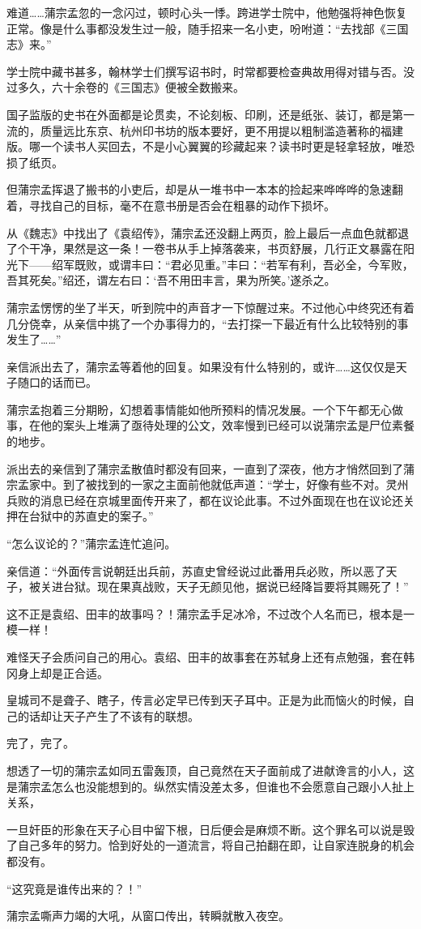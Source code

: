 难道……蒲宗孟忽的一念闪过，顿时心头一悸。跨进学士院中，他勉强将神色恢复正常。像是什么事都没发生过一般，随手招来一名小吏，吩咐道：“去找部《三国志》来。”

学士院中藏书甚多，翰林学士们撰写诏书时，时常都要检查典故用得对错与否。没过多久，六十余卷的《三国志》便被全数搬来。

国子监版的史书在外面都是论贯卖，不论刻板、印刷，还是纸张、装订，都是第一流的，质量远比东京、杭州印书坊的版本要好，更不用提以粗制滥造著称的福建版。哪一个读书人买回去，不是小心翼翼的珍藏起来？读书时更是轻拿轻放，唯恐损了纸页。

但蒲宗孟挥退了搬书的小吏后，却是从一堆书中一本本的捡起来哗哗哗的急速翻着，寻找自己的目标，毫不在意书册是否会在粗暴的动作下损坏。

从《魏志》中找出了《袁绍传》，蒲宗孟还没翻上两页，脸上最后一点血色就都退了个干净，果然是这一条！一卷书从手上掉落袭来，书页舒展，几行正文暴露在阳光下——绍军既败，或谓丰曰：“君必见重。”丰曰：“若军有利，吾必全，今军败，吾其死矣。”绍还，谓左右曰：‘吾不用田丰言，果为所笑。’遂杀之。

蒲宗孟愣愣的坐了半天，听到院中的声音才一下惊醒过来。不过他心中终究还有着几分侥幸，从亲信中挑了一个办事得力的，“去打探一下最近有什么比较特别的事发生了……”

亲信派出去了，蒲宗孟等着他的回复。如果没有什么特别的，或许……这仅仅是天子随口的话而已。

蒲宗孟抱着三分期盼，幻想着事情能如他所预料的情况发展。一个下午都无心做事，在他的案头上堆满了亟待处理的公文，效率慢到已经可以说蒲宗孟是尸位素餐的地步。

派出去的亲信到了蒲宗孟散值时都没有回来，一直到了深夜，他方才悄然回到了蒲宗孟家中。到了被找到的一家之主面前他就低声道：“学士，好像有些不对。灵州兵败的消息已经在京城里面传开来了，都在议论此事。不过外面现在也在议论还关押在台狱中的苏直史的案子。”

“怎么议论的？”蒲宗孟连忙追问。

亲信道：“外面传言说朝廷出兵前，苏直史曾经说过此番用兵必败，所以恶了天子，被关进台狱。现在果真战败，天子无颜见他，据说已经降旨要将其赐死了！”

这不正是袁绍、田丰的故事吗？！蒲宗孟手足冰冷，不过改个人名而已，根本是一模一样！

难怪天子会质问自己的用心。袁绍、田丰的故事套在苏轼身上还有点勉强，套在韩冈身上却是正合适。

皇城司不是聋子、瞎子，传言必定早已传到天子耳中。正是为此而恼火的时候，自己的话却让天子产生了不该有的联想。

完了，完了。

想透了一切的蒲宗孟如同五雷轰顶，自己竟然在天子面前成了进献谗言的小人，这是蒲宗孟怎么也没能想到的。纵然实情没差太多，但谁也不会愿意自己跟小人扯上关系，

一旦奸臣的形象在天子心目中留下根，日后便会是麻烦不断。这个罪名可以说是毁了自己多年的努力。恰到好处的一道流言，将自己拍翻在即，让自家连脱身的机会都没有。

“这究竟是谁传出来的？！”

蒲宗孟嘶声力竭的大吼，从窗口传出，转瞬就散入夜空。

